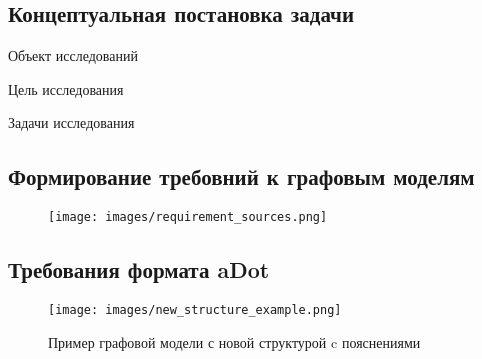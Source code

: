 \subsection{Концептуальная постановка задачи}
\begin{frame}%

\begin{block}{Объект исследований}
\textexample{\ObjectOfResearch}
\end{block}

\begin{block}{Цель исследования}
\textexample{\GoalOfResearch}
\end{block}

\begin{block}{Задачи исследования}
\begin{enumerate}
\end{enumerate}
\end{block}

\end{frame}

\subsection{Формирование требовний к графовым моделям}
\begin{frame}%
	\begin{figure}
		\centering
		\texttt{[image: images/requirement\_sources.png]}
		\caption{}
		\label{fig:requirementSources}
	\end{figure}
\end{frame}
\subsection{Требования формата aDot}
\begin{frame}%
	\begin{figure}
		\centering
		\texttt{[image: images/new\_structure\_example.png]}
		\caption{Пример графовой модели с новой структурой c пояснениями}
	\end{figure}
\end{frame}
